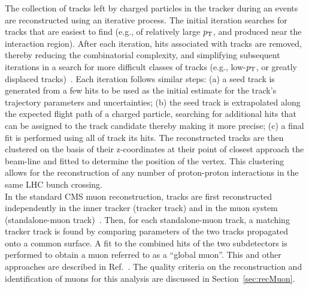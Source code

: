 

\indent The collection of tracks left by charged particles in the tracker during an events are 
reconstructed using an iterative process. The initial iteration searches for tracks 
that are easiest to find (e.g., of relatively large $p_{\mathrm{T}}$, and produced near the 
interaction region). After each iteration, hits associated with tracks are removed, 
thereby reducing the combinatorial complexity, and simplifying subsequent iterations 
in a search for more difficult classes of tracks (e.g., low-$p_{\mathrm{T}}$, or greatly displaced
tracks)~\cite{Chatrchyan:2014fea}. Each iteration follows similar steps: (a) a seed 
track is generated from a few hits to be used as the initial estimate for the track's 
trajectory parameters and uncertainties; (b) the seed track is extrapolated along the 
expected flight path of a charged particle, searching for additional hits that can be 
assigned to the track candidate thereby making it more precise; (c) a final fit is performed 
using all of track its hits. The reconstructed tracks are then clustered on the basis of 
their z-coordinates at their point of closest approach the beam-line and fitted to determine 
the position of the vertex. This clustering allows for the reconstruction of any number 
of proton-proton interactions in the same LHC bunch crossing.\\
\indent In the standard CMS muon reconstruction, tracks are first reconstructed independently 
in the inner tracker (tracker track) and in the muon system (standalone-muon 
track)~\cite{1748-0221-7-10-P10002}. Then, for each standalone-muon track, a matching tracker 
track is found by comparing parameters of the two tracks propagated onto a common surface. A 
fit to the combined hits of the two subdetectors is performed to obtain a muon referred to as 
a ``global muon''. This and other approaches are described in Ref.~\cite{PAS-MUO-10-002}. The 
quality criteria on the reconstruction and identification of muons for this analysis are 
discussed in Section~\ref{sec:recMuon}. \\
